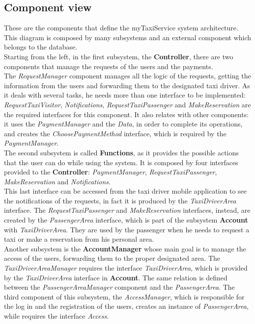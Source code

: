 	\newpage
		\subsection{Component view}
		These are the components that define the myTaxiService system architecture. This diagram is composed by many subsystems and an external component which belongs to the database.\\ Starting from the left, in the first subsystem, the \textbf{Controller}, there are two components that manage the requests of the users and the payments.\\ The \textit{RequestManager} component manages all the logic of the requests, getting the information from the users and forwarding them to the designated taxi driver. As it deals with several tasks, he needs more than one interface to be implemented: \textit{RequestTaxiVisitor}, \textit{Notifications}, \textit{RequestTaxiPassenger} and \textit{MakeReservation} are the required interfaces for this component. It also relates with other components: it uses the \textit{PaymentManager} and the \textit{Data}, in order to complete its operations, and creates the \textit{ChoosePaymentMethod} interface, which is required by the \textit{PaymentManager}.\\
		The second subsystem is called \textbf{Functions}, as it provides the possible actions that the user can do while using the system. It is composed by four interfaces provided to the \textbf{Controller}: \textit{PaymentManager}, \textit{RequestTaxiPassenger}, \textit{MakeReservation} and \textit{Notifications}.\\
		This last interface can be accessed from the taxi driver mobile application to see the notifications of the requests, in fact it is produced by the \textit{TaxiDriverArea} interface.
		The \textit{RequestTaxiPassenger} and \textit{MakeReservation} interfaces, instead, are created by the \textit{PassengerArea} interface, which is part of the subsystem \textbf{Account} with \textit{TaxiDriverArea}. They are used by the passenger when he needs to request a taxi or make a reservation from his personal area.\\
		Another subsystem is the \textbf{AccountManager} whose main goal is to manage the access of the users, forwarding them to the proper designated area. The \textit{TaxiDriverAreaManager} requires the interface \textit{TaxiDriverArea}, which is provided by the \textit{TaxiDriverArea} interface in \textbf{Account}. The same relation is defined between the \textit{PassengerAreaManager} component and the \textit{PassengerArea}. The third component of this subsystem, the \textit{AccessManager}, which is responsible for the log in and the registration of the users, creates an instance of \textit{PassengerArea}, while requires the interface \textit{Access}.\\
